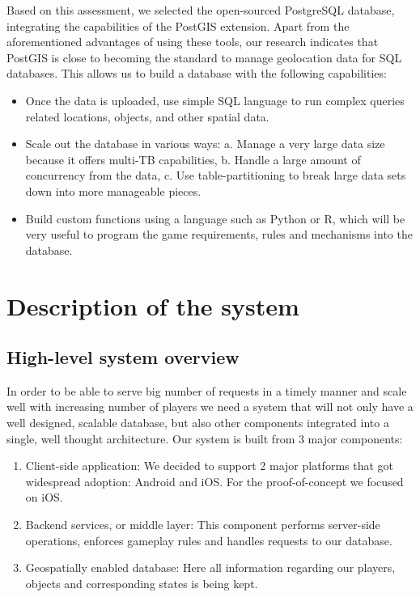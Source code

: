 \documentclass[conference]{IEEEtran}
\begin{document}
Based on this assessment, we selected the open-sourced PostgreSQL database, integrating the capabilities of the PostGIS extension. Apart from the aforementioned advantages of using these tools, our research indicates that PostGIS is close to becoming the standard to manage geolocation data for SQL databases.  This allows us to build a database with the following capabilities:

\begin{itemize}
\item	Once the data is uploaded, use simple SQL language to run complex queries related locations, objects, and other spatial data. 
\item Scale out the database in various ways: a. Manage a very large data size because it offers multi-TB capabilities, b. Handle a large amount of concurrency from the data, c. Use table-partitioning to break large data sets down into more manageable pieces.
\item Build custom functions using a language such as Python or R, which will be very useful to program the game requirements, rules and mechanisms into the database. 
\end{itemize}

\section{Description of the system}

\subsection{High-level system overview}
In order to be able to serve big number of requests in a timely manner and scale well with increasing number of players we need a system that will not only have a well designed, scalable database, but also other components integrated into a single, well thought architecture. Our system is built from 3 major components:

\begin{enumerate}
  \item Client-side application: We decided to support 2 major platforms that got widespread adoption: Android and iOS. For the proof-of-concept we focused on iOS. 
  \item Backend services, or middle layer: This component performs server-side operations, enforces gameplay rules and handles requests to our database. 
  \item Geospatially enabled database: Here all information regarding our players, objects and corresponding states is being kept. 
\end{enumerate}
\end{document}
